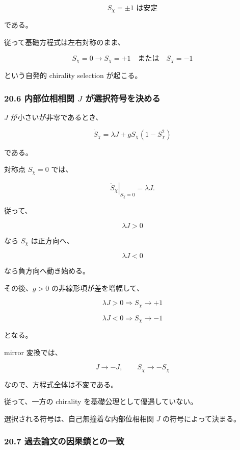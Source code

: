 \documentclass[
  a4paper,
]{ltjsarticle}
\begin{document}
\[
\boxed{
S_\chi=\pm1
\text{ は安定}
}
\tag{166}
\]

である。

従って基礎方程式は左右対称のまま、

\[
\boxed{
S_\chi=0
\longrightarrow
S_\chi=+1
\quad\text{または}\quad
S_\chi=-1
}
\tag{167}
\]

という自発的 chirality selection が起こる。

\subsubsection{\texorpdfstring{20.6 内部位相相関 \(J\)
が選択符号を決める}{20.6 内部位相相関 J が選択符号を決める}}\label{ux5185ux90e8ux4f4dux76f8ux76f8ux95a2-j-ux304cux9078ux629eux7b26ux53f7ux3092ux6c7aux3081ux308b}

\(J\) が小さいが非零であるとき、

\[
\dot S_\chi
=
\lambda J
+
gS_\chi(1-S_\chi^2)
\]

である。

対称点 \(S_\chi=0\) では、

\[
\left.
\dot S_\chi
\right|_{S_\chi=0}
=
\lambda J.
\tag{168}
\]

従って、

\[
\lambda J>0
\]

なら \(S_\chi\) は正方向へ、

\[
\lambda J<0
\]

なら負方向へ動き始める。

その後、\(g>0\) の非線形項が差を増幅して、

\[
\boxed{
\lambda J>0
\Longrightarrow
S_\chi\to+1
}
\tag{169}
\]

\[
\boxed{
\lambda J<0
\Longrightarrow
S_\chi\to-1
}
\tag{170}
\]

となる。

mirror 変換では、

\[
J\to-J,
\qquad
S_\chi\to-S_\chi
\]

なので、方程式全体は不変である。

従って、一方の chirality を基礎公理として優遇していない。

選択される符号は、自己無撞着な内部位相相関 \(J\) の符号によって決まる。

\subsubsection{20.7
過去論文の因果鎖との一致}\label{ux904eux53bbux8ad6ux6587ux306eux56e0ux679cux9396ux3068ux306eux4e00ux81f4}
\end{document}
